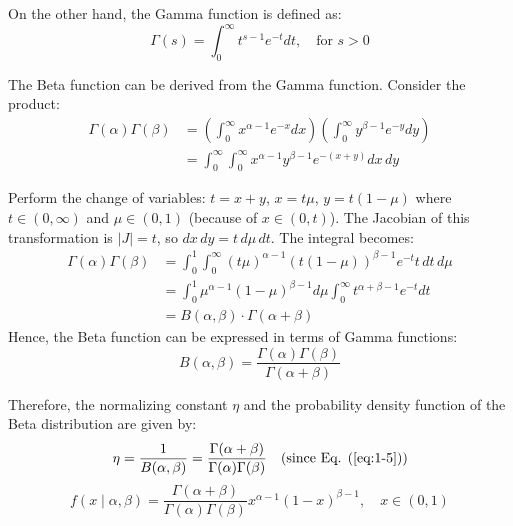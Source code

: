 On the other hand, the Gamma function is defined as:
\begin{equation}
\Gamma(s) = \int_0^{\infty} t^{s - 1} e^{-t} dt, \quad \text{for } s > 0
\end{equation}

The Beta function can be derived from the Gamma function. Consider the product:
\begin{align}
\Gamma(\alpha)\Gamma(\beta) &= \left( \int_0^{\infty} x^{\alpha - 1} e^{-x} dx \right) \left( \int_0^{\infty} y^{\beta - 1} e^{-y} dy \right) \\
&= \int_0^{\infty} \int_0^{\infty} x^{\alpha - 1} y^{\beta - 1} e^{-(x + y)} dx\,dy
\end{align}

Perform the change of variables: $t = x + y$, $x = t\mu$, $y = t(1 - \mu)$ where $t \in (0, \infty)$ and $\mu \in (0, 1)$ (because of $x \in (0, t)$). The Jacobian of this transformation is $|J| = t$, so $dx\,dy = t\, d\mu\, dt$. The integral becomes:
\begin{align}
\Gamma(\alpha)\Gamma(\beta) &= \int_0^1 \int_0^{\infty} (t\mu)^{\alpha - 1} (t(1 - \mu))^{\beta - 1} e^{-t} t\, dt\, d\mu \\
&= \int_0^1 \mu^{\alpha - 1} (1 - \mu)^{\beta - 1} d\mu \int_0^{\infty} t^{\alpha + \beta - 1} e^{-t} dt \\
&= B(\alpha, \beta) \cdot \Gamma(\alpha + \beta)
\end{align}
Hence, the Beta function can be expressed in terms of Gamma functions:
\begin{equation} \label{eq:1-12}
B(\alpha, \beta) = \frac{\Gamma(\alpha)\Gamma(\beta)}{\Gamma(\alpha + \beta)}
\end{equation}

Therefore, the normalizing constant $\eta$ and the probability density function of the Beta distribution are given by:
\begin{equation*}
\eta = \frac{1}{B(\alpha, \beta)} = \frac{\Gamma(\alpha + \beta)}{\Gamma(\alpha)\Gamma(\beta)} \quad \text{(since Eq. (\ref{eq:1-5}))}
\end{equation*}
\begin{equation}
f(x \mid \alpha, \beta) = \frac{\Gamma(\alpha + \beta)}{\Gamma(\alpha)\Gamma(\beta)} x^{\alpha - 1}(1 - x)^{\beta - 1}, \quad x \in (0, 1)
\end{equation}

